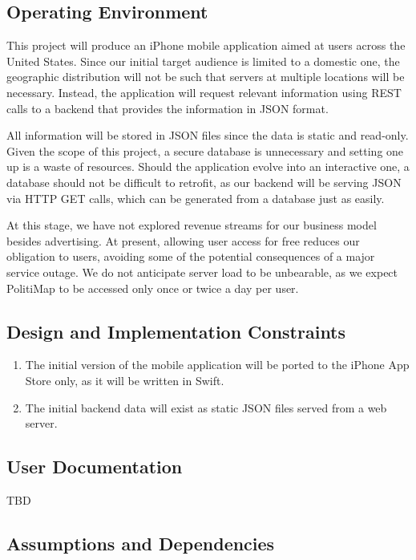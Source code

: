 \documentclass[12pt,oneside,letterpaper]{article}
\newcounter{use_case}
\begin{document}
\subsection{Operating Environment}
This project will produce an iPhone mobile application aimed at
users across the United States. Since our initial target audience is
limited to a domestic one, the geographic distribution will not be such
that servers at multiple locations will be necessary. Instead, the
application will request relevant information using REST calls to a
backend that provides the information in JSON format.

All information will be stored in JSON files since the data is static
and read-only. Given the scope of this project, a secure database is
unnecessary and setting one up is a waste of resources.  Should the
application evolve into an interactive one, a database should not be
difficult to retrofit, as our backend will be serving JSON via HTTP GET
calls, which can be generated from a database just as easily.

At this stage, we have not explored revenue streams for our business
model besides advertising. At present, allowing user access for free
reduces our obligation to users, avoiding some of the potential
consequences of a major service outage. We do not anticipate server
load to be unbearable, as we expect PolitiMap to be accessed only once
or twice a day per user.

\subsection{Design and Implementation Constraints}
\begin{enumerate}
\item The initial version of the mobile application will be ported to
the iPhone App Store only, as it will be written in Swift.
\item The initial backend data will exist as static JSON files
  served from a web server.
\end{enumerate}

\subsection{User Documentation}
TBD

\subsection{Assumptions and Dependencies}
\end{document}
